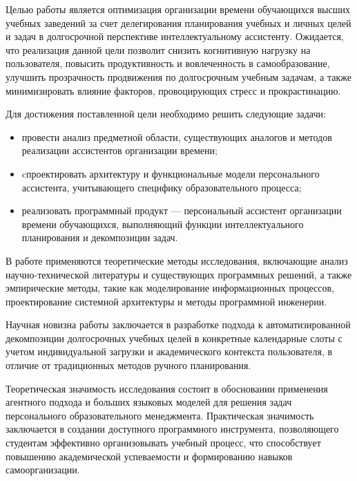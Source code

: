 Целью работы является оптимизация организации времени обучающихся высших учебных заведений за счет делегирования планирования учебных и личных целей и задач в долгосрочной перспективе интеллектуальному ассистенту. Ожидается, что реализация данной цели позволит снизить когнитивную нагрузку на пользователя, повысить продуктивность и вовлеченность в самообразование, улучшить прозрачность продвижения по долгосрочным учебным задачам, а также минимизировать влияние факторов, провоцирующих стресс и прокрастинацию.

Для достижения поставленной цели необходимо решить следующие задачи:
\begin{itemize}
    \item провести анализ предметной области, существующих аналогов и методов реализации ассистентов организации времени;
    \item cпроектировать архитектуру и функциональные модели персонального ассистента, учитывающего специфику образовательного процесса;
    \item реализовать программный продукт — персональный ассистент организации времени обучающихся, выполняющий функции интеллектуального планирования и декомпозиции задач.
\end{itemize}

В работе применяются теоретические методы исследования, включающие анализ научно-технической литературы и существующих программных решений, а также эмпирические методы, такие как моделирование информационных процессов, проектирование системной архитектуры и методы программной инженерии.

Научная новизна работы заключается в разработке подхода к автоматизированной декомпозиции долгосрочных учебных целей в конкретные календарные слоты с учетом индивидуальной загрузки и академического контекста пользователя, в отличие от традиционных методов ручного планирования.

Теоретическая значимость исследования состоит в обосновании применения агентного подхода и больших языковых моделей для решения задач персонального образовательного менеджмента. Практическая значимость заключается в создании доступного программного инструмента, позволяющего студентам эффективно организовывать учебный процесс, что способствует повышению академической успеваемости и формированию навыков самоорганизации.
